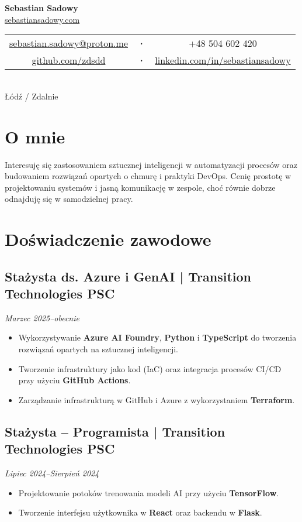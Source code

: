 \documentclass[a4paper,10pt]{article}
\begin{document}
\begin{center}
    {\Huge\textbf{Sebastian Sadowy}} \\[0.3cm]
    \href{https://sebastiansadowy.com}{sebastiansadowy.com} \\[0.2cm]
    \begin{tabular}{c c c}
        \href{mailto:sebastian.sadowy@proton.me}{sebastian.sadowy@proton.me} &
        \textbf{·} &
        +48 504 602 420 \\
        \href{https://github.com/zdsdd}{github.com/zdsdd} &
        \textbf{·} &
        \href{https://www.linkedin.com/in/sebastiansadowy}{linkedin.com/in/sebastiansadowy}
    \end{tabular} \\
    Łódź / Zdalnie
\end{center}

\section{O mnie}

Interesuję się zastosowaniem sztucznej inteligencji w automatyzacji procesów oraz budowaniem rozwiązań opartych o chmurę i praktyki DevOps. Cenię prostotę w projektowaniu systemów i jasną komunikację w zespole, choć równie dobrze odnajduję się w samodzielnej pracy.

\section{Doświadczenie zawodowe}

\subsection{Stażysta ds. Azure i GenAI | Transition Technologies PSC}
\textit{Marzec 2025--obecnie}
\begin{itemize}[leftmargin=0.5cm, nosep]
    \item Wykorzystywanie \textbf{Azure AI Foundry}, \textbf{Python} i \textbf{TypeScript} do tworzenia rozwiązań opartych na sztucznej inteligencji.
    \item Tworzenie infrastruktury jako kod (IaC) oraz integracja procesów CI/CD przy użyciu \textbf{GitHub Actions}.
    \item Zarządzanie infrastrukturą w GitHub i Azure z wykorzystaniem \textbf{Terraform}.
\end{itemize}

\subsection{Stażysta – Programista | Transition Technologies PSC}
\textit{Lipiec 2024--Sierpień 2024}
\begin{itemize}[leftmargin=0.5cm, nosep]
    \item Projektowanie potoków trenowania modeli AI przy użyciu \textbf{TensorFlow}.
    \item Tworzenie interfejsu użytkownika w \textbf{React} oraz backendu w \textbf{Flask}.
\end{itemize}
\end{document}
